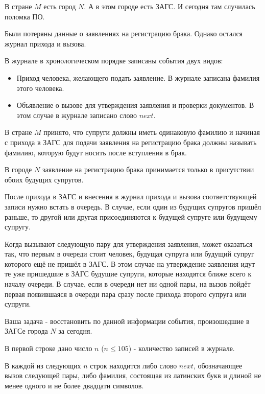 
В стране $M$ есть город $N$. А в этом городе есть ЗАГС. И сегодня там случилась поломка ПО.

Были потеряны данные о заявлениях на регистрацию брака. Однако остался журнал прихода и вызова.

В журнале в хронологическом порядке записаны события двух видов:

\begin{itemize}
    \item Приход человека, желающего подать заявление. В журнале записана фамилия этого человека.
    \item Объявление о вызове для утверждения заявления и проверки документов. В этом случае в журнале записано слово $next$.
\end{itemize}

В стране $M$ принято, что супруги должны иметь одинаковую фамилию и начиная с прихода в ЗАГС 
для подачи заявления на регистрацию брака должны называть фамилию, которую будут носить после 
вступления в брак.

В городе $N$ заявление на регистрацию брака принимается только в присутствии обоих будущих 
супругов.

После прихода в ЗАГС и внесения в журнал прихода и вызова соответствующей записи нужно 
встать в очередь. В случае, если один из будущих супругов пришёл раньше, то другой или другая 
присоединяются к будущей супруге или будущему супругу.

Когда вызывают следующую пару для утверждения заявления, может оказаться так, что первым 
в очереди стоит человек, будущая супруга или будущий супруг которого ещё не пришёл в ЗАГС. 
В этом случае на утверждение заявления идут те уже пришедшие в ЗАГС будущие супруги, которые 
находятся ближе всего к началу очереди. В случае, если в очереди нет ни одной пары, на вызов 
пойдёт первая появившаяся в очереди пара сразу после прихода второго супруга или супруги.

Ваша задача - восстановить по данной информации события, произошедшие в ЗАГСе города $N$ за сегодня.


В первой строке дано число $n$ ($n \leq 105$) - количество записей в журнале.

В каждой из следующих $n$ строк находится либо слово $next$, обозначающее вызов следующей пары, 
либо фамилия, состоящая из латинских букв и длиной не менее одного и не более двадцати символов.

